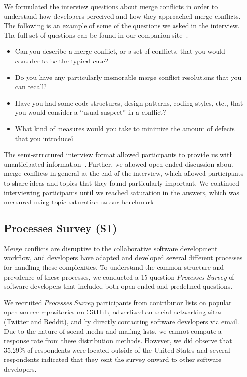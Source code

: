 We formulated the interview questions about merge conflicts in order to understand how developers perceived and how they approached merge conflicts.
The following is an example of some of the questions we asked in the interview.
The full set of questions can be found in our companion site~\cite{companion_site}.
\begin{itemize}
	\item Can you describe a merge conflict, or a set of conflicts, that you would consider to be the typical case?
	\item Do you have any particularly memorable merge conflict resolutions that you can recall?
	\item Have you had some code structures, design patterns, coding styles, etc., that you would consider a ``usual suspect'' in a conflict?
	\item What kind of measures would you take to minimize the amount of defects that you introduce?
\end{itemize}

The semi-structured interview format allowed participants to provide us with unanticipated information~\cite{seaman2008qualitative}. 
Further, we allowed open-ended discussion about merge conflicts in general at the end of the interview, which allowed participants to share ideas and topics that they found particularly important. 
We continued interviewing participants until we reached saturation in the answers, which was measured using topic saturation as our benchmark~\cite{fusch2015we}.

\subsection{Processes Survey (S1)}\label{processes_survey}

Merge conflicts are disruptive to the collaborative software development workflow, and developers have adapted and developed several different processes for handling these complexities.
To understand the common structure and prevalence of these processes, we conducted a 15-question \textit{Processes Survey} of software developers that included both open-ended and predefined questions.

We recruited \textit{Processes Survey} participants from contributor lists on popular open-source repositories on GitHub, advertised on social networking sites (Twitter and Reddit), and by directly contacting software developers via email.
Due to the nature of social media and mailing lists, we cannot compute a response rate from these distribution methods.
However, we did observe that 35.29\% of respondents were located outside of the United States and several respondents indicated that they sent the survey onward to other software developers.

